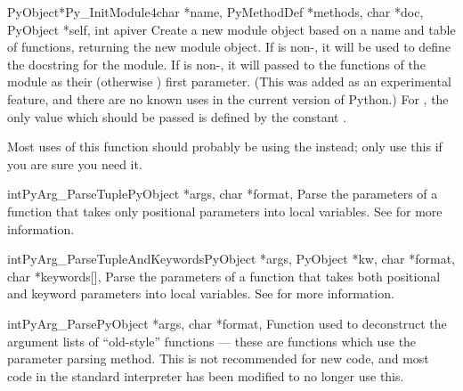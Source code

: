\documentclass{manual}
\begin{document}
\begin{cfuncdesc}{PyObject*}{Py_InitModule4}{char *name,
                                             PyMethodDef *methods,
                                             char *doc, PyObject *self,
                                             int apiver}
  Create a new module object based on a name and table of functions,
  returning the new module object.  If  is non-\NULL, it will
  be used to define the docstring for the module.  If  is
  non-\NULL, it will passed to the functions of the module as their
  (otherwise \NULL) first parameter.  (This was added as an
  experimental feature, and there are no known uses in the current
  version of Python.)  For , the only value which should
  be passed is defined by the constant .

    Most uses of this function should probably be using
  the  instead; only use this if you are
  sure you need it.
\end{cfuncdesc}

\begin{cfuncdesc}{int}{PyArg_ParseTuple}{PyObject *args, char *format,
                                         \moreargs}
  Parse the parameters of a function that takes only positional
  parameters into local variables.  See
   for more information.
\end{cfuncdesc}

\begin{cfuncdesc}{int}{PyArg_ParseTupleAndKeywords}{PyObject *args,
                    PyObject *kw, char *format, char *keywords[], \moreargs}
  Parse the parameters of a function that takes both positional and
  keyword parameters into local variables.  See
   for more information.
\end{cfuncdesc}

\begin{cfuncdesc}{int}{PyArg_Parse}{PyObject *args, char *format, \moreargs}
  Function used to deconstruct the argument lists of ``old-style''
  functions --- these are functions which use the
   parameter parsing method.  This is not
  recommended for new code, and most code in the standard interpreter
  has been modified to no longer use this.
\end{cfuncdesc}
\end{document}
